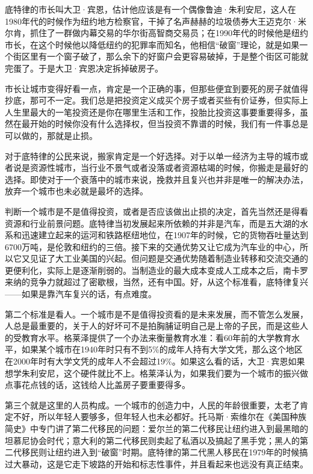 底特律的市长叫大卫·宾恩，估计他应该是有一个偶像鲁迪·朱利安尼，这人在1980年代的时候作为纽约地方检察官，干掉了名声赫赫的垃圾债券大王迈克尔·米尔肯，抓住了一群做内幕交易的华尔街高智商交易员；在1990年代的时候他是纽约市长，在这个时候他以降低纽约的犯罪率而知名，他相信``破窗''理论，就是如果一个街区里有一个窗子破了，那么余下的好窗户会更容易破掉，于是整个街区可能就完蛋了。于是大卫·宾恩决定拆掉破房子。

市长让城市变得好看一点，肯定是一个正确的事，但那些便宜到要死的房子就值得抄底，那可不一定。我们总是把投资定义成买个房子或者买些有价证券，但实际上人生里最大的一笔投资还是你在哪里生活和工作，投胎比投资这事要重要得多，虽然在最开始的时候你没有什么选择权，但当投资不靠谱的时候，我们有一件事总是可以做的，那就是止损。

对于底特律的公民来说，搬家肯定是一个好选择。对于以单一经济为主导的城市或者说是资源性城市，当行业不景气或者没落或者资源枯竭的时候，你搬走是最好的选择。即使对于一个衰落中的城市来说，挽救并且复兴也并非是唯一的解决办法，放弃一个城市也未必就是最坏的选择。

判断一个城市是不是值得投资，或者是否应该做出止损的决定，首先当然还是得看资源和行业前景问题。底特律当初发展起来所依赖的并非是汽车，而是五大湖的水系和迅速建立起来的运河和铁路枢纽地位，在1907年的时候，它的货物吞吐量达到6700万吨，是伦敦和纽约的三倍。接下来的交通优势又让它成为汽车业的中心，所以它又见证了大工业美国的兴起。但问题是交通优势随着制造业转移和交流交通的更便利化，实际上是逐渐削弱的。当制造业的最大成本变成人工成本之后，南卡罗来纳的竞争力就超过了密歇根，当然，还有中国。好，从这个标准看，底特律复兴------如果是靠汽车复兴的话，有点难度。

第二个标准是看人。一个城市是不是值得投资看的是未来发展，而不管怎么发展，人总是最重要的，关于人的好坏可不是拍胸脯证明自己是上帝的子民，而是这些人的受教育水平。格莱泽提供了一个办法来衡量教育水准：看60年前的大学教育水平，如果某个城市在1940年时只有不到5\%的成年人持有大学文凭，那么这个地区在2000年时有大学文凭的成年人不会超过19\%。如果这么看的话，大卫·宾恩如果想学朱利安尼，这个硬件就比不上。格莱泽认为，如果我们要为一个城市的振兴做点事花点钱的话，这钱给人比盖房子要重要得多。

第三个就是这里的人员构成。一个城市的创造力中，人民的年龄很重要，太老了肯定不好，所以年轻人要够多，但年轻人也未必都好。托马斯·索维尔在《美国种族简史》中专门讲了第二代移民的问题：爱尔兰的第二代移民让纽约进入到最黑暗的坦慕尼协会时代；意大利的第二代移民则卖起了私酒以及搞起了黑手党；黑人的第二代移民则让纽约进入到``破窗''时期。底特律的第二代黑人移民在1979年的时候搞过大暴动，这是它走下坡路的开始和标志性事件，并且看起来也远没有真正结束。

